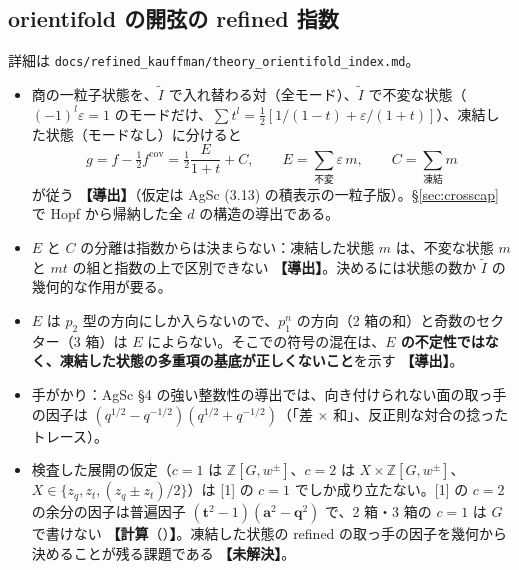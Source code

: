 \documentclass[a4paper,10pt]{ltjsarticle}
\newcommand{\ba}{\bm{a}}
\newcommand{\bq}{\bm{q}}
\newcommand{\bt}{\bm{t}}
\newcommand{\deriv}{\textbf{【導出】}}
\newcommand{\comp}[1]{\textbf{【計算}\if\relax\detokenize{#1}\relax\else（#1）\fi\textbf{】}}
\newcommand{\open}{\textbf{【未解決】}}
\begin{document}
\subsection{orientifold の開弦の refined 指数}
詳細は \texttt{docs/refined\_kauffman/theory\_orientifold\_index.md}。
\begin{itemize}
\item 商の一粒子状態を、$\tilde I$ で入れ替わる対（全モード）、$\tilde I$ で不変な状態（$(-1)^l\varepsilon = 1$ のモードだけ、$\sum t^l = \tfrac12[1/(1-t) + \varepsilon/(1+t)]$）、凍結した状態（モードなし）に分けると
\[
g = f - \tfrac12 f^{\mathrm{cov}} = \tfrac12\frac{E}{1+t} + C,\qquad E = \sum_{\text{不変}}\varepsilon\, m,\qquad C = \sum_{\text{凍結}} m
\]
が従う \deriv（仮定は AgSc (3.13) の積表示の一粒子版）。§\ref{sec:crosscap} で Hopf から帰納した全 $d$ の構造の導出である。
\item $E$ と $C$ の分離は指数からは決まらない：凍結した状態 $m$ は、不変な状態 $m$ と $mt$ の組と指数の上で区別できない \deriv。決めるには状態の数か $\tilde I$ の幾何的な作用が要る。
\item $E$ は $p_2$ 型の方向にしか入らないので、$p_1^n$ の方向（2 箱の和）と奇数のセクター（3 箱）は $E$ によらない。そこでの符号の混在は、\textbf{$E$ の不定性ではなく、凍結した状態の多重項の基底が正しくないこと}を示す \deriv。
\item 手がかり：AgSc §4 の強い整数性の導出では、向き付けられない面の取っ手の因子は $(q^{1/2} - q^{-1/2})(q^{1/2} + q^{-1/2})$（「差 $\times$ 和」、反正則な対合の捻ったトレース）。
\item 検査した展開の仮定（$c = 1$ は $\mathbb{Z}[G, w^\pm]$、$c = 2$ は $X\times\mathbb{Z}[G, w^\pm]$、$X \in \{z_q, z_t, (z_q\pm z_t)/2\}$）は [1] の $c = 1$ でしか成り立たない。[1] の $c = 2$ の余分の因子は普遍因子 $(\bt^2-1)(\ba^2-\bq^2)$ で、2 箱・3 箱の $c = 1$ は $G$ で書けない \comp{}。凍結した状態の refined の取っ手の因子を幾何から決めることが残る課題である \open。
\end{itemize}
\end{document}
